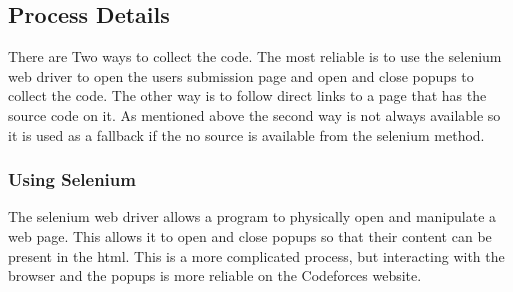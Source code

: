 \documentclass{article}
\begin{document}
\subsection{Process Details}
There are Two ways to collect the code. The most reliable is to use the selenium web driver to open the users submission page and open and close popups to collect the code. The other way is to follow direct links to a page that has the source code on it. As mentioned above the second way is not always available so it is used as a fallback if the no source is available from the selenium method.

\subsubsection{Using Selenium}
The selenium web driver allows a program to physically open and manipulate a web page. This allows it to open and close popups so that their content can be present in the html. This is a more complicated process, but interacting with the browser and the popups is more reliable on the Codeforces website.
\end{document}
